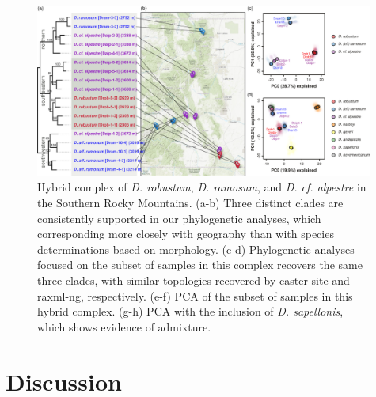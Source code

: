 \documentclass[11pt]{article}
\begin{document}
\begin{figure}[t!]
	\centering
	  \includegraphics[width=0.99\textwidth]{./figures/ramosum-robustum-alpestre3}	
	\caption{
        Hybrid complex of \emph{D. robustum}, \emph{D. ramosum}, and \emph{D. cf. alpestre} in the Southern Rocky Mountains. 
        (a-b) Three distinct clades are consistently supported in our phylogenetic analyses, which corresponding more closely with geography than with species determinations based on morphology.
        (c-d) Phylogenetic analyses focused on the subset of samples in this complex
        recovers the same three clades, with similar topologies recovered by caster-site and raxml-ng, respectively.
        (e-f) PCA of the subset of samples in this hybrid complex.
        (g-h) PCA with the inclusion of \emph{D. sapellonis}, which shows evidence of admixture.        
	}
	\label{fig:robustum}
\end{figure}



\section{Discussion}
\end{document}
